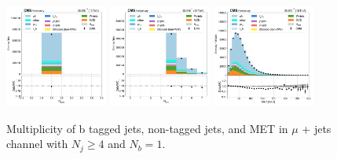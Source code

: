 \begin{figure}[htb!]
    \centering
    \includegraphics[width=0.3\textwidth]{chapters/Analysis/sectionPlots/figures/data_mc_overlays/mujet_2016_cat_gt4_eq1_signal_linear_jet_n_bjets}
    \includegraphics[width=0.3\textwidth]{chapters/Analysis/sectionPlots/figures/data_mc_overlays/mujet_2016_cat_gt4_eq1_signal_linear_jet_n_jets}
    \includegraphics[width=0.3\textwidth]{chapters/Analysis/sectionPlots/figures/data_mc_overlays/mujet_2016_cat_gt4_eq1_signal_linear_misc_met_mag}
    \caption{Multiplicity of b tagged jets, non-tagged jets, and MET in
    $\mu$ + jets channel with $N_{j} \geq 4$ and $N_{b} = 1$.
    \label{fig:analysis:plots:mujet_1_jetmet}}
\end{figure}

